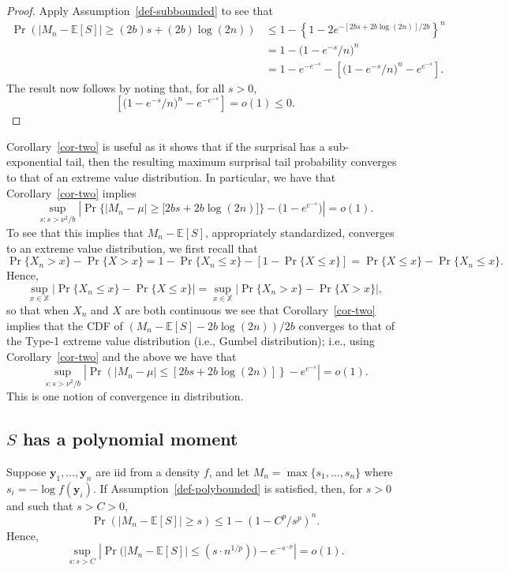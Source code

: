 \documentclass[
  12pt]{article}
\newcommand{\E}{\mathbb{E}}
\theoremstyle{plain}
\theoremstyle{plain}
\theoremstyle{definition}
\theoremstyle{plain}
\theoremstyle{remark}
\begin{document}
\begin{proof}
Apply Assumption~\ref{def-subbounded} to see that \begin{align*}
    \Pr\left(|M_n-\E[S]|\ge (2b)s+(2b)\log(2n)\right)
     & \le 1- \left\{1-2e^{-[2bs+2b\log(2n)]/2b}\right\}^n                       \\
     & = 1-\big(1-e^{-s}/n\big)^n                                     \\
     & = 1-e^{-e^{-s}}-\left[\big(1-e^{-s}/n\big)^n-e^{e^{-s}}\right].
\end{align*} The result now follows by noting that, for all \(s>0\), \[
    \left[\big(1-e^{-s}/n\big)^n-e^{-e^{-s}}\right]= o(1)\le 0.
\]
\end{proof}

Corollary~\ref{cor-two} is useful as it shows that if the surprisal has
a sub-exponential tail, then the resulting maximum surprisal tail
probability converges to that of an extreme value distribution. In
particular, we have that Corollary~\ref{cor-two} implies \[
    \sup_{s:s>\nu^2/b}\left|\Pr\Big\{|M_n-\mu|\ge \big[2bs+2b\log(2n)\big]\Big\}-\big(1-e^{e^{-s}}\big)\right| = o(1).
\] To see that this implies that \(M_n-\E[S]\), appropriately
standardized, converges to an extreme value distribution, we first
recall that \[
    \Pr\{X_n>x\}-\Pr\{X>x\}=1-\Pr\{X_n\le x\}-\left[1-\Pr\{X\le x\}\right]=\Pr\{X\le x\}-\Pr\{X_n\le x\}.
\] Hence, \[
    \sup_{x\in\mathbb{X}}|\Pr\{X_n\le x\}-\Pr\{X\le x\}|=\sup_{x\in\mathbb{X}}|\Pr\{X_n> x\}-\Pr\{X> x\}|,
\] so that when \(X_n\) and \(X\) are both continuous we see that
Corollary~\ref{cor-two} implies that the CDF of
\((M_n-\E[S]-2b\log(2n))/2b\) converges to that of the Type-1 extreme
value distribution (i.e., Gumbel distribution); i.e., using
Corollary~\ref{cor-two} and the above we have that \[
    \sup_{s:s>\nu^2/b}\left|\Pr\left(|M_n-\mu|\le [2bs+2b\log(2n)]\right\}-e^{e^{-s}}\right|=o(1).
\] This is one notion of convergence in distribution.

\subsection{\texorpdfstring{\(S\) has a polynomial
moment}{S has a polynomial moment}}\label{s-has-a-polynomial-moment}

\protect{}\label{lem:bounds_poly}
Suppose \(\bm{y}_1,\dots,\bm{y}_n\) are iid from a density \(f\), and
let \(M_n = \max\{s_1,\dots,s_n\}\) where \(s_i = -\log f(\bm{y}_i)\).
If Assumption~\ref{def-polybounded} is satisfied, then, for \(s>0\) and
such that \(s>C>0\), \[
  \Pr\left(|M_n-\E[S]|\ge s\right) \le 1- (1-C^p/s^p)^n.
\] Hence, \[
    \sup_{s:s>C} \left|\Pr\big(|M_n-\E[S]|\le (s\cdot n^{1/p})\big)-e^{-s^{-p}}\right|=o(1).
\]
\end{document}
